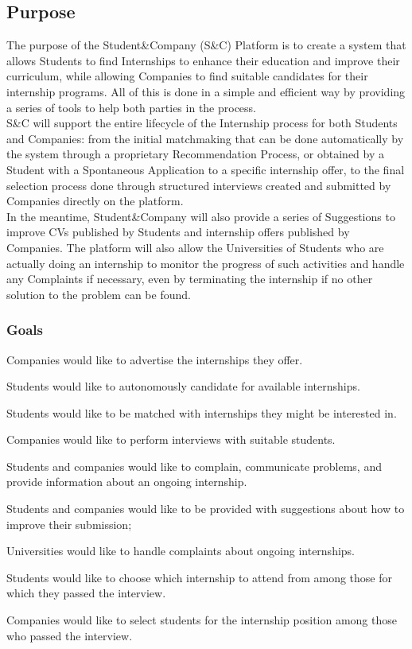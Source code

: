 \subsection{Purpose}
The purpose of the Student\&Company (S\&C) Platform is to create a system that allows Students to find Internships to enhance their education and improve their curriculum, while allowing Companies to find suitable candidates for their internship programs. All of this is done in a simple and efficient way by providing a series of tools to help both parties in the process.\\
S\&C will support the entire lifecycle of the Internship process for both Students and Companies: from the initial matchmaking that can be done automatically by the system through a proprietary Recommendation Process, or obtained by a Student with a Spontaneous Application to a specific internship offer, to the final selection process done through structured interviews created and submitted by Companies directly on the platform.\\%
In the meantime, Student\&Company will also provide a series of Suggestions to improve CVs published by Students and internship offers published by Companies. The platform will also allow the Universities of Students who are actually doing an internship to monitor the progress of such activities and handle any Complaints if necessary, even by terminating the internship if no other solution to the problem can be found.
\subsubsection{Goals}
\begin{enumerate}[label={\color{titleColor}[G\arabic*]}]
\item Companies would like to advertise the internships they offer.
\item Students would like to autonomously candidate for available internships.
\item Students would like to be matched with internships they might be interested in.
\item Companies would like to perform interviews with suitable students.
\item Students and companies would like to complain, communicate problems, and provide information about an ongoing internship.
\item Students and companies would like to be provided with suggestions about how to improve their submission;
\item Universities would like to handle complaints about ongoing internships.
\item Students would like to choose which internship to attend from among those for which they passed the interview.
\item Companies would like to select students for the internship position among those who passed the interview.
 
\end{enumerate}


